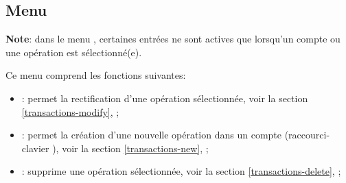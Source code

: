 \subsection{Menu \label{home-menus-edit}}

\textbf{Note}: dans le menu , certaines entrées ne sont actives que lorsqu'un compte ou une opération est sélectionné(e).

Ce menu comprend les fonctions suivantes:

\vspace{3mm}
\noindent
\begin{minipage}{.7\linewidth}
	\begin{itemize}[rightmargin=.6cm]
		\item {}: permet la rectification d'une opération sélectionnée, voir la section \vref{transactions-modify}, ;
		\item {}: permet la création d'une nouvelle opération dans un compte (raccourci-clavier ), voir la section \vref{transactions-new}, ;
		\item {}: supprime une opération sélectionnée, voir la section \vref{transactions-delete}, ;
	\end{itemize}
\end{minipage}
\hspace{10pt}	
